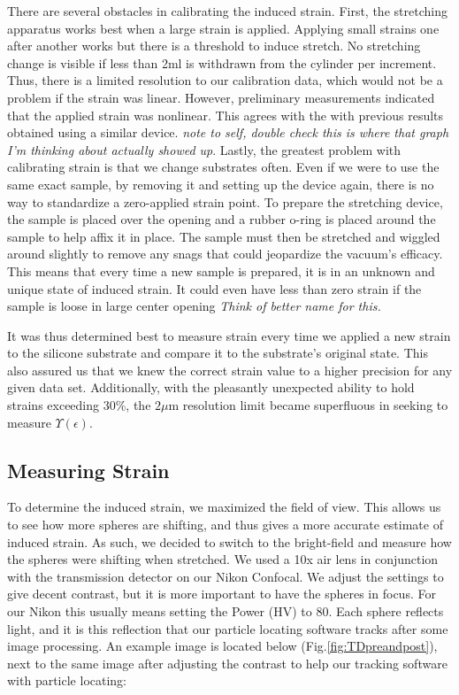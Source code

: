 There are several obstacles in calibrating the induced strain. First, the stretching apparatus works best when a large strain is applied. Applying small strains one after another works but there is a threshold to induce stretch. No stretching change is visible if less than 2ml is withdrawn from the cylinder per increment. Thus, there is a limited resolution to our calibration data, which would not be a problem if the strain was linear. However, preliminary measurements indicated that the applied strain was nonlinear. This agrees with the with previous results \cite{na2008time} obtained using a similar device. \emph{note to self, double check this is where that graph I'm thinking about actually showed up}. Lastly, the greatest problem with calibrating strain is that we change substrates often. Even if we were to use the same exact sample, by removing it and setting up the device again, there is no way to standardize a zero-applied strain point. To prepare the stretching device, the sample is placed over the opening and a rubber o-ring is placed around the sample to help affix it in place. The sample must then be stretched and wiggled around slightly to remove any snags that could jeopardize the vacuum's efficacy. This means that every time a new sample is prepared, it is in an unknown and unique state of induced strain. It could even have less than zero strain if the sample is loose in large center opening \emph{Think of better name for this.} 

It was thus determined best to measure strain every time we applied a new strain to the silicone substrate and compare it to the substrate's original state. This also assured us that we knew the correct strain value to a higher precision for any given data set. Additionally, with the pleasantly unexpected ability to hold strains exceeding 30\%, the $2\mu$m resolution  limit became superfluous in seeking to measure $\Upsilon(\epsilon)$.


\subsection{Measuring Strain}
To determine the induced strain, we maximized the field of view. This allows us to see how more spheres are shifting, and thus gives a more accurate estimate of induced strain. As such, we decided to switch to the bright-field and measure how the spheres were shifting when stretched. We used a 10x air lens in conjunction with the transmission detector on our Nikon Confocal. We adjust the settings to give decent contrast, but it is more important to have the spheres in focus. For our Nikon this usually means setting the Power (HV) to 80. Each sphere reflects light, and it is this reflection that our particle locating software tracks after some image processing. An example image is located below (Fig.\ref{fig:TDpreandpost}), next to the same image after adjusting the contrast to help our tracking software with particle locating: 

